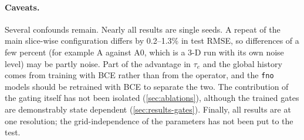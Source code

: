 \paragraph{Caveats.} Several confounds remain. Nearly all results are single seeds. A repeat of the main slice-wise configuration differs by 0.2--1.3\% in test RMSE, so differences of a few percent (for example A against A0, which is a 3-D run with its own noise level) may be partly noise. Part of the advantage in $\tau_e$ and the global history comes from training with BCE rather than from the operator, and the \texttt{fno} models should be retrained with BCE to separate the two. The contribution of the gating itself has not been isolated (\cref{sec:ablations}), although the trained gates are demonstrably state dependent (\cref{sec:results-gates}). Finally, all results are at one resolution; the grid-independence of the parameters has not been put to the test.


